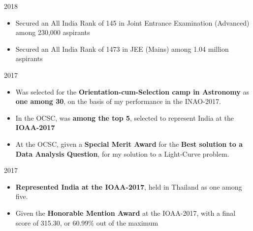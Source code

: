 
 {}
 {
     2018
 }
 {  \vspace*{-8mm}
     \begin{itemize}
     \item Secured an All India Rank of 145 in Joint       Entrance Examination (Advanced) among 230,000 aspirants
     \item Secured an All India Rank of 1473 in JEE (Mains) among 1.04 million aspirants
     \end{itemize}
 }

 {}
 {
     2017
 }
 {  \vspace*{-8mm}
     \begin{itemize}
     \item Was selected for the \textbf{Orientation-cum-Selection camp in Astronomy} as \textbf{one among 30}, on the basis of
     my performance in the INAO-2017.
     \item In the OCSC, was \textbf{among the top 5}, selected to represent India at the \textbf{IOAA-2017}
     \item At the OCSC, given a \textbf{Special Merit Award} for the \textbf{Best solution to a Data Analysis Question}, for my
     solution to a Light-Curve problem.
     \end{itemize}
 }

 {}
 {
     2017
 }
 {  \vspace*{-8mm}
     \begin{itemize}
     \item \textbf{Represented India at the IOAA-2017}, held in Thailand as one among five.
     \item Given the \textbf{Honorable Mention Award} at the IOAA-2017, with a final score of 315.30, or 60.99\% out of the maximum
     \end{itemize}
 }